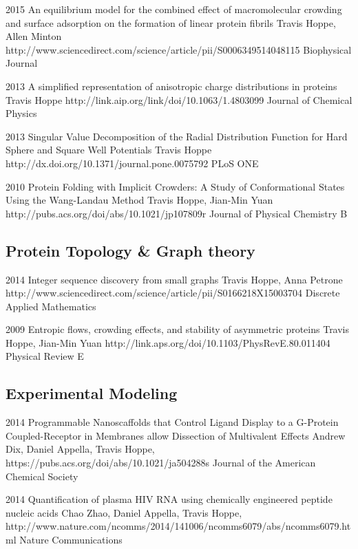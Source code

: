 \documentclass[]{scrartcl}
\begin{document}
\begin{cleanCV}
\Paper
{2015}
{An equilibrium model for the combined effect of macromolecular crowding and surface adsorption on the formation of linear protein fibrils}
{Travis Hoppe, Allen Minton}
{http://www.sciencedirect.com/science/article/pii/S0006349514048115}
{Biophysical Journal}

\Paper
{2013}
{A simplified representation of anisotropic charge distributions in proteins}
{Travis Hoppe}
{http://link.aip.org/link/doi/10.1063/1.4803099}
{Journal of Chemical Physics}

\Paper
{2013}
{Singular Value Decomposition of the Radial Distribution Function 
for Hard Sphere and Square Well Potentials}
{Travis Hoppe}
{http://dx.doi.org/10.1371/journal.pone.0075792}
{PLoS ONE}

\Paper
{2010}
{Protein Folding with Implicit Crowders: 
  A Study of Conformational States Using the Wang-Landau Method}
{Travis Hoppe, Jian-Min Yuan}
{http://pubs.acs.org/doi/abs/10.1021/jp107809r}
{Journal of Physical Chemistry B}


\subsection{Protein Topology \& Graph theory}

\Paper
{2014}
{Integer sequence discovery from small graphs}
{Travis Hoppe, Anna Petrone}
{http://www.sciencedirect.com/science/article/pii/S0166218X15003704}
{Discrete Applied Mathematics}

\Paper
{2009}
{Entropic flows, crowding effects, and stability of asymmetric proteins}
{Travis Hoppe, Jian-Min Yuan}
{http://link.aps.org/doi/10.1103/PhysRevE.80.011404}
{Physical Review E}


\subsection{Experimental Modeling}

\Paper
{2014}
{Programmable Nanoscaffolds that Control Ligand Display to a G-Protein Coupled-Receptor in Membranes allow Dissection of Multivalent Effects}
{Andrew Dix, Daniel Appella, Travis Hoppe, \etal}
{https://pubs.acs.org/doi/abs/10.1021/ja504288s}
{Journal of the American Chemical Society}

\Paper
{2014}
{Quantification of plasma HIV RNA using chemically engineered peptide nucleic acids}
{Chao Zhao, Daniel Appella, Travis Hoppe, \etal}
{http://www.nature.com/ncomms/2014/141006/ncomms6079/abs/ncomms6079.html}
{Nature Communications}


\end{cleanCV}
\end{document}
